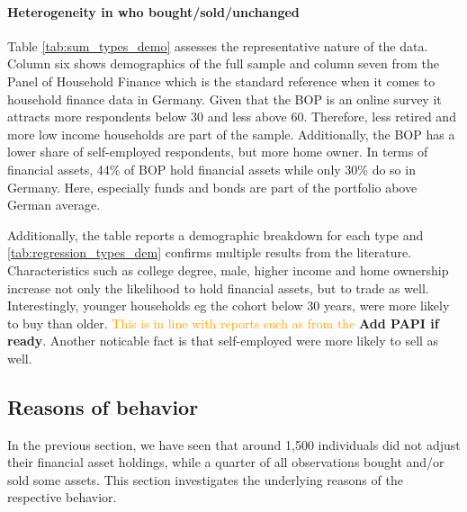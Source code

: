 \documentclass[ProjectABM]{subfiles}
\begin{document}
%



\paragraph{Heterogeneity in who bought/sold/unchanged}
Table \ref{tab:sum_types_demo} assesses the representative nature of the data. Column six shows demographics of the full sample and column seven from the Panel of Household Finance which is the standard reference when it comes to household finance data in Germany. Given that the BOP is an online survey it attracts more respondents below 30 and less above 60. Therefore, less retired and more low income households are part of the sample. Additionally, the BOP has a lower share of self-employed respondents, but more home owner. In terms of financial assets, 44\% of BOP hold financial assets while only 30\% do so in Germany. Here, especially funds and bonds are part of the portfolio above German average.

Additionally, the table reports a demographic breakdown for each type and \ref{tab:regression_types_dem} confirms multiple results from the literature. Characteristics such as college degree, male, higher income and home ownership increase not only the likelihood to hold financial assets, but to trade as well. Interestingly, younger households eg the cohort below 30 years, were more likely to buy than older. \textcolor{orange}{This is in line with reports such as from the \cite{DAI_2021}} \textbf{Add PAPI if ready}. Another noticable fact is that self-employed were more likely to sell as well.






\subsection{Reasons of behavior}
In the previous section, we have seen that around 1,500 individuals did not adjust their financial asset holdings, while a quarter of all observations bought and/or sold some assets. This section investigates the underlying reasons of the respective behavior.
\end{document}
